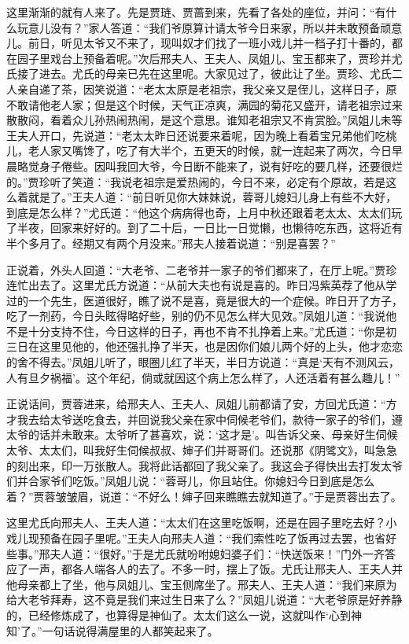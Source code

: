 \documentclass[12pt,oneside]{book}
\begin{document}
这里渐渐的就有人来了。先是贾琏、贾蔷到来，先看了各处的座位，并问：“有什么玩意儿没有？”家人答道：“我们爷原算计请太爷今日来家，所以并未敢预备顽意儿。前日，听见太爷又不来了，现叫奴才们找了一班小戏儿并一档子打十番的，都在园子里戏台上预备着呢。”次后邢夫人、王夫人、凤姐儿、宝玉都来了，贾珍并尤氏接了进去。尤氏的母亲已先在这里呢。大家见过了，彼此让了坐。贾珍、尤氏二人亲自递了茶，因笑说道：“老太太原是老祖宗，我父亲又是侄儿，这样日子，原不敢请他老人家；但是这个时候，天气正凉爽，满园的菊花又盛开，请老祖宗过来散散闷，看着众儿孙热闹热闹，是这个意思。谁知老祖宗又不肯赏脸。”凤姐儿未等王夫人开口，先说道：“老太太昨日还说要来着呢，因为晚上看着宝兄弟他们吃桃儿，老人家又嘴馋了，吃了有大半个，五更天的时候，就一连起来了两次，今日早晨略觉身子倦些。因叫我回大爷，今日断不能来了，说有好吃的要几样，还要很烂的。”贾珍听了笑道：“我说老祖宗是爱热闹的，今日不来，必定有个原故，若是这么着就是了。”王夫人道：“前日听见你大妹妹说，蓉哥儿媳妇儿身上有些不大好，到底是怎么样？”尤氏道：“他这个病病得也奇，上月中秋还跟着老太太、太太们玩了半夜，回家来好好的。到了二十后，一日比一日觉懒，也懒待吃东西，这将近有半个多月了。经期又有两个月没来。”邢夫人接着说道：“别是喜罢？”

正说着，外头人回道：“大老爷、二老爷并一家子的爷们都来了，在厅上呢。”贾珍连忙出去了。这里尤氏方说道：“从前大夫也有说是喜的。昨日冯紫英荐了他从学过的一个先生，医道很好，瞧了说不是喜，竟是很大的一个症候。昨日开了方子，吃了一剂药，今日头眩得略好些，别的仍不见怎么样大见效。”凤姐儿道：“我说他不是十分支持不住，今日这样的日子，再也不肯不扎挣着上来。”尤氏道：“你是初三日在这里见他的，他还强扎挣了半天，也是因你们娘儿两个好的上头，他才恋恋的舍不得去。”凤姐儿听了，眼圈儿红了半天，半日方说道：“真是‘天有不测风云，人有旦夕祸福’。这个年纪，倘或就因这个病上怎么样了，人还活着有甚么趣儿！”

正说话间，贾蓉进来，给邢夫人、王夫人、凤姐儿前都请了安，方回尤氏道：“方才我去给太爷送吃食去，并回说我父亲在家中伺候老爷们，款待一家子的爷们，遵太爷的话并未敢来。太爷听了甚喜欢，说：‘这才是’。叫告诉父亲、母亲好生伺候太爷、太太们，叫我好生伺候叔叔、婶子们并哥哥们。还说那《阴骘文》，叫急急的刻出来，印一万张散人。我将此话都回了我父亲了。我这会子得快出去打发太爷们并合家爷们吃饭。”凤姐儿说：“蓉哥儿，你且站住。你媳妇今日到底是怎么着？”贾蓉皱皱眉，说道：“不好么！婶子回来瞧瞧去就知道了。”于是贾蓉出去了。

这里尤氏向邢夫人、王夫人道：“太太们在这里吃饭啊，还是在园子里吃去好？小戏儿现预备在园子里呢。”王夫人向邢夫人道：“我们索性吃了饭再过去罢，也省好些事。”邢夫人道：“很好。”于是尤氏就吩咐媳妇婆子们：“快送饭来！”门外一齐答应了一声，都各人端各人的去了。不多一时，摆上了饭。尤氏让邢夫人、王夫人并他母亲都上了坐，他与凤姐儿、宝玉侧席坐了。邢夫人、王夫人道：“我们来原为给大老爷拜寿，这不竟是我们来过生日来了么？”凤姐儿说道：“大老爷原是好养静的，已经修炼成了，也算得是神仙了。太太们这么一说，这就叫作‘心到神知’了。”一句话说得满屋里的人都笑起来了。
\end{document}
